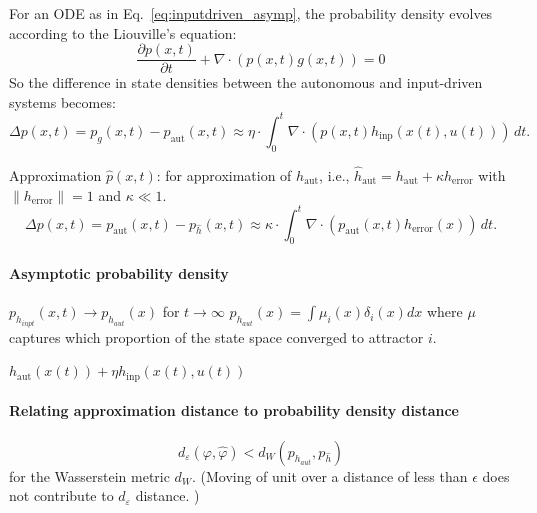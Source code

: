 \documentclass{article}
\newcommand{\ascomment}[1]{\textcolor{ascolor}{(#1)}}
\theoremstyle{definition} \newtheorem{definition}{Definition}
\theoremstyle{remark} \newtheorem{remark}{Remark}
\newcounter{ct}
\begin{document}
For an ODE as in Eq.~\ref{eq:inputdriven_asymp}, the probability density evolves according to the Liouville's equation:
\begin{equation}
\frac{\partial p(x,t)}{\partial t} + \nabla \cdot \left( p(x,t) g(x,t) \right) = 0
\end{equation}
So the difference in state densities between the autonomous and input-driven systems becomes:
\begin{equation}
\Delta p(x,t) = p_{g}(x,t) - p_{\operatorname{aut}}(x,t) \approx \eta \cdot \int_0^t \nabla \cdot \left( p(x,t) h_{\operatorname{inp}}(x(t), u(t)) \right) \, dt.
\end{equation}

Approximation $\hat p(x,t)$:
for approximation of $h_{\operatorname{aut}}$, i.e.,  $\hat h_{\operatorname{aut}} = h_{\operatorname{aut}} + \kappa h_{\operatorname{error}}$
with $\|h_{\operatorname{error}}\|=1$ and $\kappa \ll 1$. %
\begin{equation}
\Delta p(x,t) = p_{\operatorname{aut}}(x,t) - p_{\hat{h}}(x,t) \approx \kappa \cdot \int_0^t \nabla \cdot \left( p_{\operatorname{aut}}(x,t) h_{\operatorname{error}}(x) \right) \, dt.
\end{equation}


\paragraph{Asymptotic probability density}
$p_{h_{inpt}}(x,t) \rightarrow p_{h_{aut}}(x)$ for $t\rightarrow \infty$ %
$p_{h_{aut}}(x) = \int \mu_i(x)\delta_i(x)dx$ where $\mu$ captures which proportion of the state space converged to attractor $i$.

$h_{\operatorname{aut}}(x(t)) + \eta h_{\operatorname{inp}}(x(t), u(t))$

\paragraph{Relating approximation distance to probability density distance}
\begin{equation}
d_\varepsilon(\varphi,\hat \varphi) < d_W(p_{h_{aut}}, p_{\hat h})
\end{equation}
for the Wasserstein metric $d_W$.
\ascomment{Moving of unit over a distance of  less than $\epsilon$ does not contribute to $d_\varepsilon$ distance. }
\end{document}
